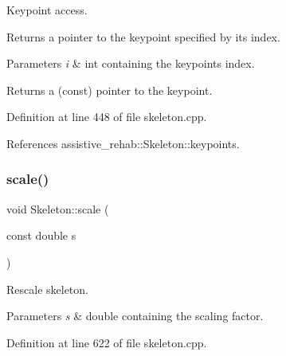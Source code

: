 Keypoint access. 

Returns a pointer to the keypoint specified by its index. 
\begin{DoxyParams}{Parameters}
{\em i} & int containing the keypoint\textquotesingle{}s index. \\
\hline
\end{DoxyParams}
\begin{DoxyReturn}{Returns}
a (const) pointer to the keypoint. 
\end{DoxyReturn}


Definition at line 448 of file skeleton.\+cpp.


\begin{DoxyCode}{0}

\end{DoxyCode}


References assistive\+\_\+rehab\+::\+Skeleton\+::keypoints.

\mbox{\label{classassistive__rehab_1_1Skeleton_a21fded128e2240e4dd507030b7386670}} 
\subsubsection{\texorpdfstring{scale()}{scale()}}
{\footnotesize\ttfamily void Skeleton\+::scale (\begin{DoxyParamCaption}\item[{const double}]{s }\end{DoxyParamCaption})\hspace{0.3cm}{\ttfamily [inherited]}}



Rescale skeleton. 


\begin{DoxyParams}{Parameters}
{\em s} & double containing the scaling factor. \\
\hline
\end{DoxyParams}


Definition at line 622 of file skeleton.\+cpp.


\begin{DoxyCode}{0}

\end{DoxyCode}


